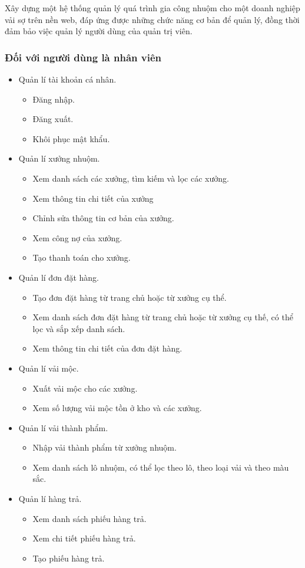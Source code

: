 Xây dựng một hệ thống quản lý quá trình gia công nhuộm cho một doanh nghiệp vải sợ trên nền web, đáp ứng được những chức năng cơ bản để quản lý, đồng thời đảm bảo việc quản lý người dùng của quản trị viên.
\subsubsection{Đối với người dùng là nhân viên}
\begin{itemize}
    \item Quản lí tài khoản cá nhân.
    \begin{itemize}
        \item Đăng nhập.
        \item Đăng xuất.
        \item Khôi phục mật khẩu.
    \end{itemize}
    \item Quản lí xưởng nhuộm.
    \begin{itemize}
        \item Xem danh sách các xưởng, tìm kiếm và lọc các xưởng.
        \item Xem thông tin chi tiết của xưởng
        \item Chỉnh sửa thông tin cơ bản của xưởng.
        \item Xem công nợ của xưởng.
        \item Tạo thanh toán cho xưởng.
    \end{itemize}
    \item Quản lí đơn đặt hàng.
    \begin{itemize}
        \item Tạo đơn đặt hàng từ trang chủ hoặc từ xưởng cụ thể.
        \item Xem danh sách đơn đặt hàng từ trang chủ hoặc từ xưởng cụ thế, có thể lọc và sắp xếp danh sách.
        \item Xem thông tin chi tiết của đơn đặt hàng.
    \end{itemize}
    \item Quản lí vải mộc.
    \begin{itemize}
        \item Xuất vải mộc cho các xưởng.
        \item Xem số lượng vải mộc tồn ở kho và các xưởng.
    \end{itemize}
    \item Quản lí vải thành phẩm.
    \begin{itemize}
        \item Nhập vải thành phẩm từ xưởng nhuộm.
        \item Xem danh sách lô nhuộm, có thể lọc theo lô, theo loại vải và theo màu sắc.
    \end{itemize}
    \item Quản lí hàng trả.
    \begin{itemize}
        \item Xem danh sách phiếu hàng trả.
        \item Xem chi tiết phiếu hàng trả.
        \item Tạo phiếu hàng trả.
    \end{itemize}
\end{itemize}
